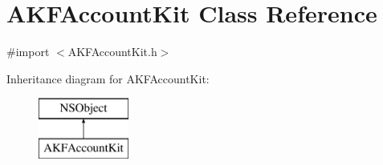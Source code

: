 \hypertarget{interface_a_k_f_account_kit}{}\section{A\+K\+F\+Account\+Kit Class Reference}
\label{interface_a_k_f_account_kit}


{\ttfamily \#import $<$A\+K\+F\+Account\+Kit.\+h$>$}

Inheritance diagram for A\+K\+F\+Account\+Kit\+:\begin{figure}[H]
\begin{center}
\leavevmode
\includegraphics[height=2.000000cm]{interface_a_k_f_account_kit}
\end{center}
\end{figure}
